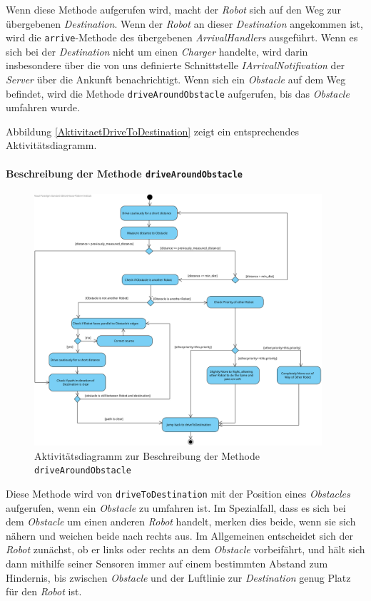 			Wenn diese Methode aufgerufen wird, macht der \textit{Robot} sich auf den Weg zur 
			übergebenen \textit{Destination}. Wenn der \textit{Robot} an dieser \textit{Destination} 
			angekommen ist, wird die \texttt{arrive}-Methode des übergebenen \textit{ArrivalHandlers} ausgeführt. Wenn es sich bei der \textit{Destination} nicht um einen \textit{Charger} handelte, wird darin insbesondere über die von uns definierte Schnittstelle \textit{IArrivalNotifivation} der \textit{Server} über die Ankunft benachrichtigt. 
			Wenn sich ein \textit{Obstacle} auf dem Weg befindet, wird die Methode \texttt{driveAroundObstacle} 
			aufgerufen, bis das \textit{Obstacle} umfahren wurde.
			
			Abbildung \ref{AktivitaetDriveToDestination} zeigt ein entsprechendes Aktivitätsdiagramm.

			\paragraph{Beschreibung der Methode \texttt{driveAroundObstacle}}
			\begin{figure}[H]
			\centering
			\includegraphics[width=0.95\textwidth]{img/1-Entwurf-7-driveAroundObstacle}
			\caption{Aktivitätsdiagramm zur Beschreibung der Methode \texttt{driveAroundObstacle}}
			\label{SequenzDriveAroundObstacle}
			\end{figure}

			Diese Methode wird von \texttt{driveToDestination} mit der Position eines \textit{Obstacles} aufgerufen, 
			wenn ein \textit{Obstacle} zu umfahren ist. 
			Im Spezialfall, dass es sich bei dem \textit{Obstacle} um einen anderen \textit{Robot} handelt, merken dies beide, wenn sie sich nähern und weichen beide nach rechts aus. 
			Im Allgemeinen entscheidet sich der \emph{Robot} zunächst, ob er links oder rechts an dem \textit{Obstacle} vorbeifährt, 
			und hält sich dann mithilfe seiner Sensoren immer auf einem bestimmten Abstand zum Hindernis, bis zwischen 
			\textit{Obstacle} und der Luftlinie zur \textit{Destination} genug Platz für den \textit{Robot} ist.
			
